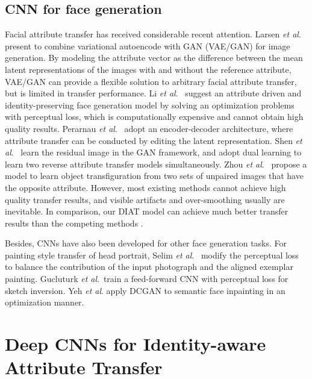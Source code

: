 \documentclass[journal]{IEEEtran}
\newcommand{\etal}{\textit{et al}.}
\begin{document}
\subsection{CNN for face generation}

Facial attribute transfer has received considerable recent attention.
Larsen \etal~\cite{larsen2015autoencoding} present to combine variational autoencode with GAN (VAE/GAN) for image generation.
By modeling the attribute vector as the difference between the mean latent representations of the images with and without the reference attribute, VAE/GAN can provide a flexible solution to arbitrary facial attribute transfer, but is limited in transfer performance.
Li \etal~\cite{li2016convolutional} suggest an attribute driven and identity-preserving face generation model by solving an optimization problems with perceptual loss, which is computationally expensive and cannot obtain high quality results.
Perarnau \etal~\cite{Perarnau2016} adopt an encoder-decoder architecture, where attribute transfer can be conducted by editing the latent representation.
Shen \etal~\cite{shen2017learning} learn the residual image in the GAN framework, and adopt dual learning to learn two reverse attribute transfer models simultaneously.
Zhou \etal~\cite{zhou2017genegan} propose a model to learn object transfiguration from two sets of unpaired images that have the opposite attribute. However, most existing methods cannot achieve high quality transfer results, and visible artifacts and over-smoothing usually are inevitable.
In comparison, our DIAT model can achieve much better transfer results than the competing methods \cite{li2016convolutional, yeh2016semantic, larsen2015autoencoding, Perarnau2016}.


Besides, CNNs have also been developed for other face generation tasks.
For painting style transfer of head portrait, Selim \etal~\cite{selim2016painting} modify the perceptual loss to balance the contribution of the input photograph and the aligned exemplar painting.
Gucluturk \etal~train a feed-forward CNN with perceptual loss for sketch inversion.
Yeh \etal \cite{yeh2016semantic} apply DCGAN to semantic face inpainting in an optimization manner.








\section{Deep CNNs for Identity-aware Attribute Transfer}
\label{sec:method}
\end{document}
